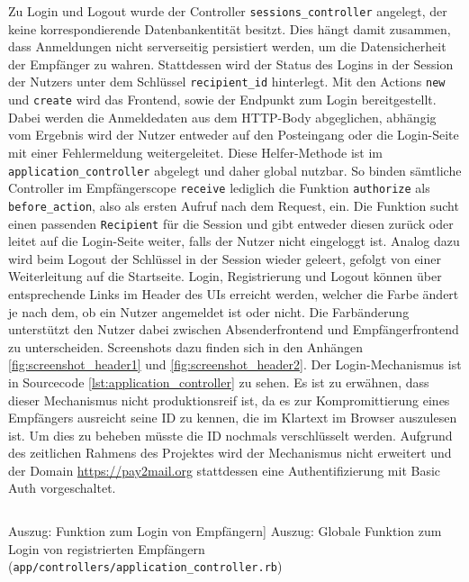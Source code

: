 \noindent Zu Login und Logout wurde der Controller \texttt{sessions\_controller} angelegt, der keine korrespondierende Datenbankentität besitzt. Dies hängt damit zusammen, dass Anmeldungen nicht serverseitig persistiert werden, um die Datensicherheit der Empfänger zu wahren. Stattdessen wird der Status des Logins in der Session der Nutzers unter dem Schlüssel \texttt{recipient\_id} hinterlegt. Mit den Actions \texttt{new} und \texttt{create} wird das Frontend, sowie der Endpunkt zum Login bereitgestellt. Dabei werden die Anmeldedaten aus dem HTTP-Body abgeglichen, abhängig vom Ergebnis wird der Nutzer entweder auf den Posteingang oder die Login-Seite mit einer Fehlermeldung weitergeleitet. Diese Helfer-Methode ist im \texttt{application\_controller} abgelegt und daher global nutzbar. So binden sämtliche Controller im Empfängerscope \texttt{receive} lediglich die Funktion \texttt{authorize} als \texttt{before\_action}, also als ersten Aufruf nach dem Request, ein. Die Funktion sucht einen passenden \texttt{Recipient} für die Session und gibt entweder diesen zurück oder leitet auf die Login-Seite weiter, falls der Nutzer nicht eingeloggt ist. Analog dazu wird beim Logout der Schlüssel in der Session wieder geleert, gefolgt von einer Weiterleitung auf die Startseite. Login, Registrierung und Logout können über entsprechende Links im Header des UIs erreicht werden, welcher die Farbe ändert je nach dem, ob ein Nutzer angemeldet ist oder nicht. Die Farbänderung unterstützt den Nutzer dabei zwischen Absenderfrontend und Empfängerfrontend zu unterscheiden. Screenshots dazu finden sich in den Anhängen \ref{fig:screenshot_header1} und \ref{fig:screenshot_header2}. Der Login-Mechanismus ist in Sourcecode \ref{lst:application_controller} zu sehen. Es ist zu erwähnen, dass dieser Mechanismus nicht produktionsreif ist, da es zur Kompromittierung eines Empfängers ausreicht seine ID zu kennen, die im Klartext im Browser auszulesen ist. Um dies zu beheben müsste die ID nochmals verschlüsselt werden. Aufgrund des zeitlichen Rahmens des Projektes wird der Mechanismus nicht erweitert und der Domain \url{https://pay2mail.org} stattdessen eine Authentifizierung mit Basic Auth vorgeschaltet.

\begin{listing}[!ht]
\inputminted[linenos]{ruby}{Listings/Pkg3/application_controller.rb}

\caption
    [Auszug: Funktion zum Login von Empfängern]
    {Auszug: Globale Funktion zum Login von registrierten Empfängern (\texttt{app/controllers/application\_controller.rb})}

\label{lst:application_controller}
\end{listing}

